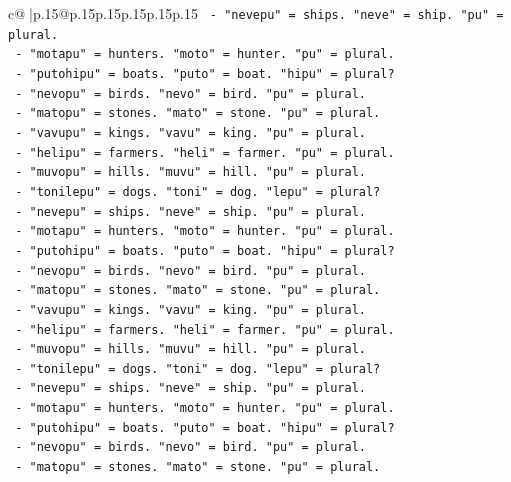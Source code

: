 \documentclass{article}
\begin{document}
{\begin{supertabular}{c@{$\;$}|p{.15\linewidth}@{}p{.15\linewidth}p{.15\linewidth}p{.15\linewidth}p{.15\linewidth}p{.15\linewidth}}
{{{\texttt{        {-} "nevepu" = ships. "neve" = ship. "pu" = plural.} \\
\texttt{        {-} "motapu" = hunters. "moto" = hunter. "pu" = plural.} \\
\texttt{        {-} "putohipu" = boats. "puto" = boat. "hipu" = plural?} \\
\texttt{        {-} "nevopu" = birds. "nevo" = bird. "pu" = plural.} \\
\texttt{        {-} "matopu" = stones. "mato" = stone. "pu" = plural.} \\
\texttt{        {-} "vavupu" = kings. "vavu" = king. "pu" = plural.} \\
\texttt{        {-} "helipu" = farmers. "heli" = farmer. "pu" = plural.} \\
\texttt{        {-} "muvopu" = hills. "muvu" = hill. "pu" = plural.} \\
\texttt{        {-} "tonilepu" = dogs. "toni" = dog. "lepu" = plural?} \\
\texttt{        {-} "nevepu" = ships. "neve" = ship. "pu" = plural.} \\
\texttt{        {-} "motapu" = hunters. "moto" = hunter. "pu" = plural.} \\
\texttt{        {-} "putohipu" = boats. "puto" = boat. "hipu" = plural?} \\
\texttt{        {-} "nevopu" = birds. "nevo" = bird. "pu" = plural.} \\
\texttt{        {-} "matopu" = stones. "mato" = stone. "pu" = plural.} \\
\texttt{        {-} "vavupu" = kings. "vavu" = king. "pu" = plural.} \\
\texttt{        {-} "helipu" = farmers. "heli" = farmer. "pu" = plural.} \\
\texttt{        {-} "muvopu" = hills. "muvu" = hill. "pu" = plural.} \\
\texttt{        {-} "tonilepu" = dogs. "toni" = dog. "lepu" = plural?} \\
\texttt{        {-} "nevepu" = ships. "neve" = ship. "pu" = plural.} \\
\texttt{        {-} "motapu" = hunters. "moto" = hunter. "pu" = plural.} \\
\texttt{        {-} "putohipu" = boats. "puto" = boat. "hipu" = plural?} \\
\texttt{        {-} "nevopu" = birds. "nevo" = bird. "pu" = plural.} \\
\texttt{        {-} "matopu" = stones. "mato" = stone. "pu" = plural.} \\
}}}
\end{supertabular}}
\end{document}
